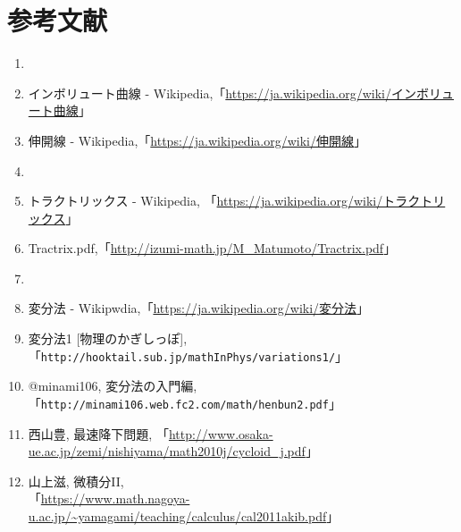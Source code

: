 \section*{参考文献}
\begin{enumerate}
  \item[] \hspace{-20pt}{\gt インボリュート曲線}
  \item インボリュート曲線 - Wikipedia,「\url{https://ja.wikipedia.org/wiki/インボリュート曲線}」
  \item 伸開線 - Wikipedia,「\url{https://ja.wikipedia.org/wiki/伸開線}」
  \item[] \hspace{-20pt}{\gt トラクトリックス}
  \item トラクトリックス - Wikipedia, 「\url{https://ja.wikipedia.org/wiki/トラクトリックス}」
  \item Tractrix.pdf,「\url{http://izumi-math.jp/M_Matumoto/Tractrix.pdf}」
  \item[] \hspace{-20pt}{\gt 変分法}
  \item 変分法 - Wikipwdia,「\url{https://ja.wikipedia.org/wiki/変分法}」
  \item 変分法1 [物理のかぎしっぽ], 「\texttt{http://hooktail.sub.jp/mathInPhys/variations1/}」
  \item @minami106, 変分法の入門編, 「\texttt{http://minami106.web.fc2.com/math/henbun2.pdf}」
    \item 西山豊, 最速降下問題,
    「\url{http://www.osaka-ue.ac.jp/zemi/nishiyama/math2010j/cycloid_j.pdf}」
  \item 山上滋, 微積分II,\\
  「\url{https://www.math.nagoya-u.ac.jp/~yamagami/teaching/calculus/cal2011akib.pdf}」
\end{enumerate}





%
